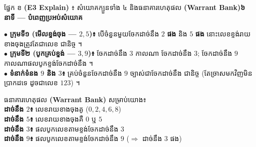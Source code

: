 \documentclass[11pt,a4paper]{article}
\newcommand{\en}[1]{{\LatinFont #1}}
\newcommand{\enbf}[1]{{\LatinFont\textbf{#1}}}
\newcommand{\cnum}[1]{{\fontsize{10pt}{11pt}\selectfont\ding{\numexpr181+#1\relax}}\hspace{0.15em}}
\newcommand{\blank}[1]{\underline{\hspace{#1}}}
\newcommand{\secbox}[2]{%
  \vspace{4pt}%
  \noindent\begin{tcolorbox}[
    enhanced, sharp corners, boxrule=0.85pt, colframe=black, colback=headband,
    left=6pt, right=6pt, top=3pt, bottom=3pt, boxsep=1pt
  ]
    {\muol\fontsize{9.6pt}{13.5pt}\selectfont #1}\hfill{\fontsize{8.8pt}{12pt}\selectfont\textbf{#2}}
  \end{tcolorbox}%
  \vspace{2pt}%
}
\begin{document}
\vspace{6pt}
\secbox{ផ្នែក ខ \enbf{(E3 Explain)} ៖ សំយោគក្បួនទាំង ៤ និងធនាគារហេតុផល \enbf{(Warrant Bank)}}{៦ នាទី \en{---} បំពេញប្រអប់សំយោគ}

\begin{minipage}[t]{9.7cm}
  \vspace{2pt}\raggedright
  $\bullet$ \textbf{ក្រុមទី១ (មើលខ្ទង់ចុង — $2, 5$)៖} បើចំនួនមួយចែកដាច់នឹង $2$ \textbf{ផង} និង $5$ \textbf{ផង} នោះលេខខ្ទង់រាយខាងចុងត្រូវតែជាលេខ \blank{1.1cm} ជានិច្ច ។\\[5pt]
  $\bullet$ \textbf{ក្រុមទី២ (បូកគ្រប់ខ្ទង់ — $3, 9$)៖} ចែកដាច់នឹង $3$ កាលណា \blank{2.7cm} ចែកដាច់នឹង $3$; ចែកដាច់នឹង $9$ កាលណាផលបូកខ្ទង់ចែកដាច់នឹង \blank{0.9cm} ។\\[5pt]
  $\bullet$ \textbf{ទំនាក់ទំនង $9$ និង $3$៖} គ្រប់ចំនួនចែកដាច់នឹង $9$ ច្បាស់ជាចែកដាច់នឹង \blank{0.8cm} ជានិច្ច (តែច្រាសមកវិញមិនប្រាកដទេ ដូចជាលេខ $123$) ។
\end{minipage}\hfill%
\begin{minipage}[t]{8.9cm}
  \vspace{0pt}
  \begin{tcolorbox}[
    enhanced, sharp corners, colback=panelgray, colframe=black,
    boxrule=0.85pt, boxsep=2pt, top=4.5pt, bottom=4.5pt, left=5pt, right=5pt
  ]
    {\muol\fontsize{8.8pt}{12.5pt}\selectfont ធនាគារហេតុផល \enbf{(Warrant Bank)} សម្រាប់យោង៖}\\[3pt]
    {\fontsize{8.5pt}{13.4pt}\selectfont
    \cnum{1} \textbf{ដាច់នឹង $2$៖} លេខរាយខាងចុងគូ ($0, 2, 4, 6, 8$)\\
    \cnum{2} \textbf{ដាច់នឹង $5$៖} លេខរាយខាងចុងគឺ $0$ ឬ $5$\\
    \cnum{3} \textbf{ដាច់នឹង $3$៖} ផលបូកលេខតាមខ្ទង់ចែកដាច់នឹង $3$\\
    \cnum{4} \textbf{ដាច់នឹង $9$៖} ផលបូកលេខតាមខ្ទង់ចែកដាច់នឹង $9$ ($\Rightarrow$ ដាច់នឹង $3$ ផង)}
  \end{tcolorbox}
\end{minipage}
\end{document}
